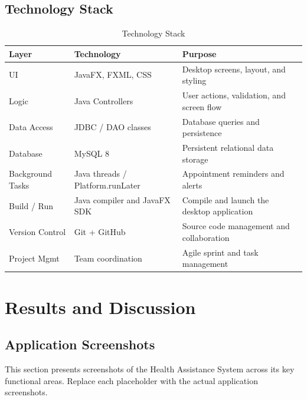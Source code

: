 \documentclass[12pt,a4paper]{report}
\newcommand{\rowO}{\rowcolor{LightGray!60}}
\begin{document}
\section{Technology Stack}

\begin{table}[H]
\centering
\caption{Technology Stack}
\begin{tabularx}{\textwidth}{l l X}
\toprule
\rowcolor{PrimaryBlue!15}
\textbf{Layer} & \textbf{Technology} & \textbf{Purpose} \\
\midrule
\rowO UI & JavaFX, FXML, CSS & Desktop screens, layout, and styling \\
Logic & Java Controllers & User actions, validation, and screen flow \\
\rowO Data Access & JDBC / DAO classes & Database queries and persistence \\
Database & MySQL 8 & Persistent relational data storage \\
\rowO Background Tasks & Java threads / Platform.runLater & Appointment reminders and alerts \\
Build / Run & Java compiler and JavaFX SDK & Compile and launch the desktop application \\
\rowO Version Control & Git + GitHub & Source code management and collaboration \\
Project Mgmt & Team coordination & Agile sprint and task management \\
\bottomrule
\end{tabularx}
\end{table}

\chapter{Results and Discussion}

\section{Application Screenshots}

This section presents screenshots of the Health Assistance System across its key functional areas. Replace each placeholder with the actual application screenshots.
\end{document}
